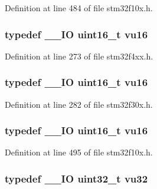 Definition at line 484 of file stm32f10x.\-h.

\hypertarget{group___exported__types_ga93d1a6b3dcfdded10a7b15548679fe0a}{
\subsubsection[{vu16}]{\setlength{\rightskip}{0pt plus 5cm}typedef \-\_\-\-\_\-\-I\-O {\bf uint16\-\_\-t} {\bf vu16}}}\label{group___exported__types_ga93d1a6b3dcfdded10a7b15548679fe0a}


Definition at line 273 of file stm32f4xx.\-h.

\hypertarget{group___exported__types_ga93d1a6b3dcfdded10a7b15548679fe0a}{
\subsubsection[{vu16}]{\setlength{\rightskip}{0pt plus 5cm}typedef \-\_\-\-\_\-\-I\-O {\bf uint16\-\_\-t} {\bf vu16}}}\label{group___exported__types_ga93d1a6b3dcfdded10a7b15548679fe0a}


Definition at line 282 of file stm32f30x.\-h.

\hypertarget{group___exported__types_ga93d1a6b3dcfdded10a7b15548679fe0a}{
\subsubsection[{vu16}]{\setlength{\rightskip}{0pt plus 5cm}typedef \-\_\-\-\_\-\-I\-O {\bf uint16\-\_\-t} {\bf vu16}}}\label{group___exported__types_ga93d1a6b3dcfdded10a7b15548679fe0a}


Definition at line 495 of file stm32f10x.\-h.

\hypertarget{group___exported__types_ga0cd21c4793673b69ecd5fd673353a145}{
\subsubsection[{vu32}]{\setlength{\rightskip}{0pt plus 5cm}typedef \-\_\-\-\_\-\-I\-O {\bf uint32\-\_\-t} {\bf vu32}}}\label{group___exported__types_ga0cd21c4793673b69ecd5fd673353a145}


